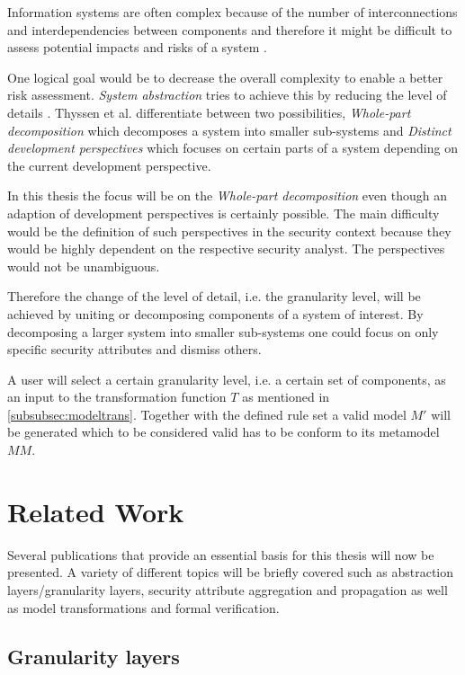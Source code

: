 Information systems are often complex because of the number of interconnections and interdependencies between components and therefore it might be difficult to assess potential impacts and risks of a system \cite{branagan}.

One logical goal would be to decrease the overall complexity to enable a better risk assessment. \textit{System abstraction} tries to achieve this by reducing the level of details \cite{branagan}. Thyssen et al. differentiate between two possibilities, \textit{Whole-part decomposition} which decomposes a system into smaller sub-systems and \textit{Distinct development perspectives} which focuses on certain parts of a system depending on the current development perspective. 

In this thesis the focus will be on the \textit{Whole-part decomposition} even though an adaption of development perspectives is certainly possible. The main difficulty would be the definition of such perspectives in the security context because they would be highly dependent on the respective security analyst. The perspectives would not be unambiguous.
  
Therefore the change of the level of detail, i.e. the granularity level, will be achieved by uniting or decomposing components of a system of interest. By decomposing a larger system into smaller sub-systems one could focus on only specific security attributes and dismiss others.

A user will select a certain granularity level, i.e. a certain set of components, as an input to the transformation function $T$ as mentioned in \ref{subsubsec:modeltrans}. Together with the defined rule set a valid model $M'$ will be generated which to be considered valid has to be conform to its metamodel $MM$.

\section{Related Work}
\label{sec:related_work}

Several publications that provide an essential basis for this thesis will now be presented. A variety of different topics will be briefly covered such as abstraction layers/granularity layers, security attribute aggregation and propagation as well as model transformations and formal verification. 

\subsection{Granularity layers}


